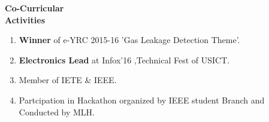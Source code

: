 \documentclass[11pt]{article}
\begin{document}
\begin{flushleft}
{\Large \bf{Co-Curricular\\ Activities}}
\begin{enumerate}
\addtolength{\itemindent}{1.7in}
\vspace{-0.50in} 
\item {\bf Winner} of e-YRC 2015-16 'Gas Leakage Detection Theme'.
\item {\bf Electronics Lead} at Infox'16 ,Technical Fest of USICT.
\item Member of IETE \& IEEE.
\item Partcipation in Hackathon organized by IEEE student Branch and \\ \hspace{1.68in}Conducted by MLH. 
\end{enumerate}
\end{flushleft}  
\end{document}
